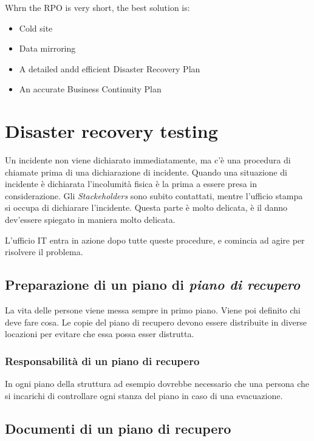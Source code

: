 Whrn the RPO is very short, the best solution is:
\begin{itemize}
  \item Cold site
  \item Data mirroring
  \item A detailed andd efficient Disaster Recovery Plan
  \item An accurate Business Continuity Plan
\end{itemize}

\section{Disaster recovery testing}

Un incidente non viene dichiarato immediatamente, ma c'è una procedura di 
chiamate prima di una dichiarazione di incidente. Quando una situazione di 
incidente è dichiarata l'incolumità fisica è la prima a essere presa in 
considerazione. Gli \textit{Stackeholders} sono subito contattati, mentre 
l'ufficio stampa si occupa di dichiarare l'incidente. Questa parte è molto 
delicata, è il danno dev'essere spiegato in maniera molto delicata.

L'ufficio IT entra in azione dopo tutte queste procedure, e comincia ad agire 
per risolvere il problema.

\subsection{Preparazione di un piano di \textit{piano di recupero}}

La vita delle persone viene messa sempre in primo piano. Viene poi definito chi 
deve fare cosa. Le copie del piano di recupero devono essere distribuite in 
diverse locazioni per evitare che essa possa esser distrutta.

\subsubsection{Responsabilità di un piano di recupero}

In ogni piano della struttura ad esempio dovrebbe necessario che una persona 
che si incarichi di controllare ogni stanza del piano in caso di una 
evacuazione.

\subsection{Documenti di un piano di recupero}

